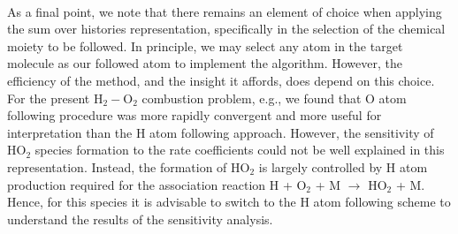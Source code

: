 \paragraph{}
As a final point, we note that there remains an element of
choice when applying the sum over histories representation,
specifically in the selection of the chemical moiety to be
followed. In principle, we may select any atom in the target
molecule as our followed atom to implement the algorithm.
However, the efficiency of the method, and the insight it
affords, does depend on this choice. For the present H$_2-$O$_2$
combustion problem, e.g., we found that O atom following
procedure was more rapidly convergent and more useful for
interpretation than the H atom following approach. However,
the sensitivity of HO$_2$ species formation to the rate coefficients
could not be well explained in this representation. Instead, the
formation of HO$_2$ is largely controlled by H atom production
required for the association reaction H + O$_2$ + M $\rightarrow$ HO$_2$ + M.
Hence, for this species it is advisable to switch to the H atom
following scheme to understand the results of the sensitivity
analysis.